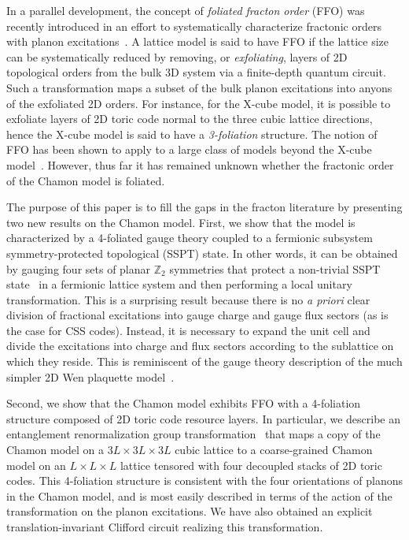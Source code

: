 \documentclass[prx,twocolumn,superscriptaddress,nofootinbib,showpacs,notitlepage]{revtex4-2}
\newcommand{\Chamon}{Chamon }
\newcommand{\arpit}[1]{{\color{ultramarine}\footnotesize{(AD) #1}}}
\begin{document}
In a parallel development, the concept of \textit{foliated fracton order} (FFO) was recently introduced in an effort to systematically characterize fractonic orders with planon excitations~\cite{shirley2017fracton,shirley2018FoliatedFracton}. A lattice model is said to have FFO if the lattice size can be systematically reduced by removing, or \textit{exfoliating}, layers of 2D topological orders from the bulk 3D system via a finite-depth quantum circuit. Such a transformation maps a subset of the bulk planon excitations into anyons of the exfoliated 2D orders. For instance, for the X-cube model, it is possible to exfoliate layers of 2D toric code normal to the three cubic lattice directions, hence the X-cube model is said to have a \textit{3-foliation} structure. The notion of FFO has been shown to apply to a large class of models beyond the X-cube model~\cite{shirley2018CB,Wang2019,Shirley2019}. However, thus far it has remained unknown whether the fractonic order of the \Chamon model is foliated.

The purpose of this paper is to fill the gaps in the fracton literature by presenting two new results on the \Chamon model. First, we show that the model is characterized by a 4-foliated gauge theory coupled to a fermionic subsystem symmetry-protected topological (SSPT) state. In other words, it can be obtained by gauging four sets of planar $\mathbb{Z}_2$ symmetries that protect a non-trivial SSPT state~\cite{you2018subsystem,you2018symmetric} in a fermionic lattice system and then performing a local unitary transformation. This is a surprising result because there is no \textit{a priori} clear division of fractional excitations into gauge charge and gauge flux sectors (as is the case for CSS codes). Instead, it is necessary to expand the unit cell and divide the excitations into charge and flux sectors according to the sublattice on which they reside. This is reminiscent of the gauge theory description of the much simpler 2D Wen plaquette model~\cite{Wen2003}.

Second, we show that the Chamon model exhibits FFO with a 4-foliation structure composed of 2D toric code resource layers. In particular, we describe an entanglement renormalization group transformation~\cite{Vidal2007,haah2014bifurcation,Dua_RG_2019} that maps a copy of the \Chamon model on a $3L\times 3L\times 3L$ cubic lattice to a coarse-grained \Chamon model on an $L\times L\times L$ lattice tensored with four decoupled stacks of 2D toric codes. This 4-foliation structure is consistent with the four orientations of planons in the \Chamon model, and is most easily described in terms of the action of the transformation on the planon excitations. We have also obtained an explicit translation-invariant Clifford circuit realizing this transformation.
\end{document}

